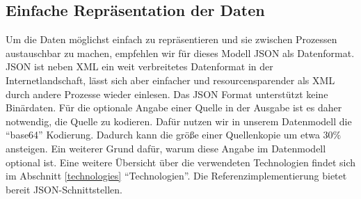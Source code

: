 \subsection{Einfache Repräsentation der Daten}
Um die Daten möglichst einfach zu repräsentieren und sie zwischen Prozessen austauschbar zu machen, empfehlen wir für dieses Modell JSON als Datenformat. JSON ist neben XML ein weit verbreitetes Datenformat in der Internetlandschaft, lässt sich aber einfacher und resourcensparender als XML durch andere Prozesse wieder einlesen. Das JSON Format unterstützt keine Binärdaten. Für die optionale Angabe einer Quelle in der Ausgabe ist es daher notwendig, die Quelle zu kodieren. Dafür nutzen wir in unserem Datenmodell die ``base64'' Kodierung. Dadurch kann die größe einer Quellenkopie um etwa $30\%$ ansteigen. Ein weiterer Grund dafür, warum diese Angabe im Datenmodell optional ist. Eine weitere Übersicht über die verwendeten Technologien findet sich im Abschnitt \ref{technologies} ``Technologien''. Die Referenzimplementierung bietet bereit JSON-Schnittstellen.
